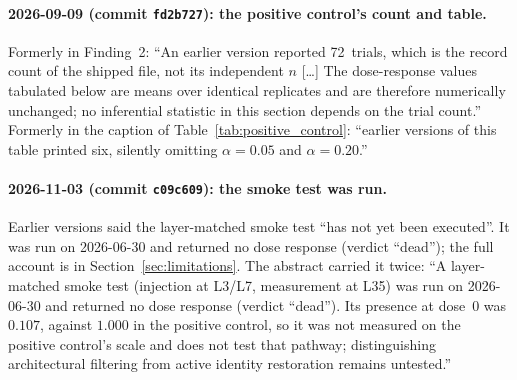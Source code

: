 \documentclass[11pt,a4paper]{article}
\begin{document}
\paragraph{2026-09-09 (commit \texttt{fd2b727}): the positive control's
count and table.} Formerly in Finding~2: ``An earlier version reported
72~trials, which is the record count of the shipped file, not its
independent $n$ [\ldots] The dose-response values tabulated below are
means over identical replicates and are therefore numerically unchanged;
no inferential statistic in this section depends on the trial count.''
Formerly in the caption of Table~\ref{tab:positive_control}: ``earlier
versions of this table printed six, silently omitting $\alpha{=}0.05$ and
$\alpha{=}0.20$.''

\paragraph{2026-11-03 (commit \texttt{c09c609}): the smoke test was
run.} Earlier versions said the layer-matched smoke test ``has not yet
been executed''. It was run on 2026-06-30 and returned no dose response
(verdict ``dead''); the full account is in Section~\ref{sec:limitations}.
The abstract carried it twice: ``A layer-matched smoke test (injection at
L3/L7, measurement at L35) was run on 2026-06-30 and returned no dose
response (verdict ``dead''). Its presence at dose~0 was $0.107$, against
$1.000$ in the positive control, so it was not measured on the positive
control's scale and does not test that pathway; distinguishing
architectural filtering from active identity restoration remains
untested.''
\end{document}
